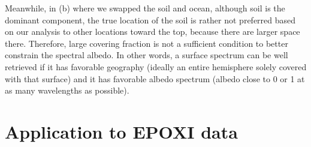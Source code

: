\documentclass[iop,numberedappendix,apj]{emulateapj}
\begin{document}
Meanwhile, in (b) where we swapped the soil and ocean, although soil is the dominant component, the true location of the soil is rather not preferred based on our analysis to other locations toward the top, because there are larger space there. 
Therefore, large covering fraction is not a sufficient condition to better constrain the spectral albedo. 
In other words, a surface spectrum can be well retrieved if it has favorable geography (ideally an entire hemisphere solely covered with that surface) and it has favorable albedo spectrum (albedo close to 0 or 1 at as many wavelengths as possible). 



\section{Application to EPOXI data}
\label{s:EPOXI}
\end{document}
